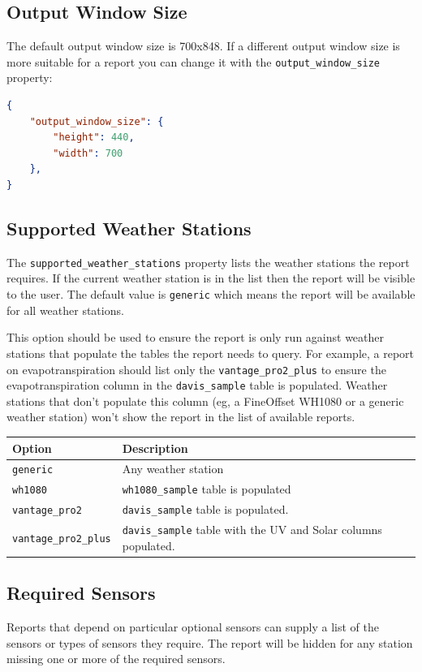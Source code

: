 \documentclass[a4paper,10pt]{book}
\begin{document}
\subsection{Output Window Size}
The default output window size is 700x848. If a different output window size is more suitable for a report you can change it with the \verb|output_window_size| property:

\begin{lstlisting}[language=json]
{
    "output_window_size": {
        "height": 440,
        "width": 700
    },
}
\end{lstlisting}

\subsection{Supported Weather Stations}
The \verb|supported_weather_stations| property lists the weather stations the report requires. If the current weather station is in the list then the report will be visible to the user. The default value is \verb|generic| which means the report will be available for all weather stations.

This option should be used to ensure the report is only run against weather stations that populate the tables the report needs to query. For example, a report on evapotranspiration should list only the \verb|vantage_pro2_plus| to ensure the evapotranspiration column in the \verb|davis_sample| table is populated. Weather stations that don't populate this column (eg, a FineOffset WH1080 or a generic weather station) won't show the report in the list of available reports.

\begin{tabular}{p{3.3cm} l}
\hline
\textbf{Option} & \textbf{Description} \\
\hline
\verb|generic| & Any weather station \\
\verb|wh1080| & \verb|wh1080_sample| table is populated\\
\verb|vantage_pro2| & \verb|davis_sample| table is populated.\\
\verb|vantage_pro2_plus| & \verb|davis_sample| table with the UV and Solar columns populated.\\
\hline
\end{tabular}

\subsection{Required Sensors}
Reports that depend on particular optional sensors can supply a list of the sensors or types of sensors they require. The report will be hidden for any station missing one or more of the required sensors.
\end{document}
